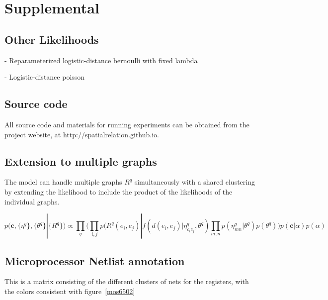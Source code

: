 \documentclass{article}
\renewcommand{\vec}[1]{\mathbf{#1}}
\begin{document}
\newpage
\section{Supplemental}

\subsection{Other Likelihoods}
\label{supp:otherlikelihoods}
 - Reparameterized logistic-distance bernoulli with fixed lambda

 - Logistic-distance poisson

\subsection{Source code}

All source code and materials for running experiments can be
obtained from the project website, at http://spatialrelation.github.io. 

\subsection{Extension to multiple graphs}
\label{supp:multigraph}
The model can handle multiple graphs $R^q$ simultaneously with a shared clustering by extending the likelihood to include the product of the likelihoods of the individual graphs. 

\begin{equation}
  p(\vec{c}, \{\eta^q\}, \{\theta^q\} | \{R^q\} ) \propto \prod_q \Bigg(\prod_{i, j} p(R^q(e_i, e_j) | f(d(e_i, e_j) | \eta^q_{c_ic_j}, \theta^q) \prod_{m, n} p(\eta^q_{mn} | \theta^q)  p(\theta^q) \Bigg) p(\vec{c} | \alpha) p(\alpha) 
\end{equation}

\subsection{Microprocessor Netlist annotation}
\label{supp:mos6502netlist}
This is a matrix consisting of the different clusters of nets for 
the registers, with the colors consistent with figure~\ref{mos6502}
\end{document}
